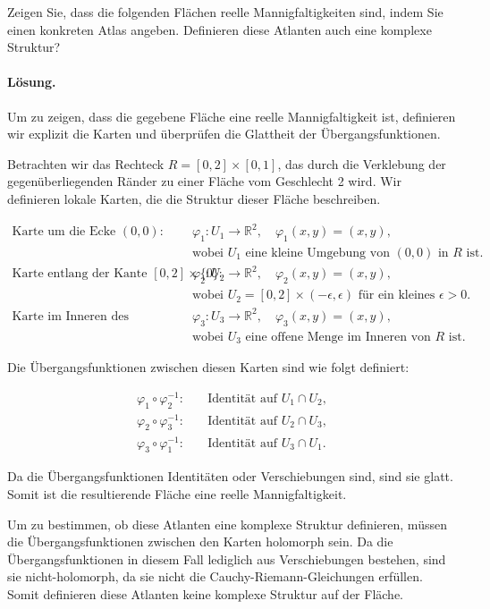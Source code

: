 \documentclass[11pt,a4paper]{article}
\begin{document}
Zeigen Sie, dass die folgenden Flächen reelle Mannigfaltigkeiten sind, indem Sie einen konkreten Atlas angeben. Definieren diese Atlanten auch eine komplexe Struktur?

\paragraph{Lösung.}
Um zu zeigen, dass die gegebene Fläche eine reelle Mannigfaltigkeit ist, definieren wir explizit die Karten und überprüfen die Glattheit der Übergangsfunktionen.

Betrachten wir das Rechteck $R = [0, 2] \times [0, 1]$, das durch die Verklebung der gegenüberliegenden Ränder zu einer Fläche vom Geschlecht 2 wird. Wir definieren lokale Karten, die die Struktur dieser Fläche beschreiben.

\begin{align*}
\text{Karte um die Ecke } (0,0): \quad & \varphi_1: U_1 \to \mathbb{R}^2, \quad \varphi_1(x,y) = (x,y), \\
& \text{wobei } U_1 \text{ eine kleine Umgebung von } (0,0) \text{ in } R \text{ ist.} \\
\text{Karte entlang der Kante } [0,2] \times \{0\}: \quad & \varphi_2: U_2 \to \mathbb{R}^2, \quad \varphi_2(x,y) = (x,y), \\
& \text{wobei } U_2 = [0,2] \times (-\epsilon, \epsilon) \text{ für ein kleines } \epsilon > 0. \\
\text{Karte im Inneren des Rechtecks:} \quad & \varphi_3: U_3 \to \mathbb{R}^2, \quad \varphi_3(x,y) = (x,y), \\
& \text{wobei } U_3 \text{ eine offene Menge im Inneren von } R \text{ ist.}
\end{align*}

Die Übergangsfunktionen zwischen diesen Karten sind wie folgt definiert:

\begin{align*}
\varphi_1 \circ \varphi_2^{-1}: \quad & \text{Identität auf } U_1 \cap U_2, \\
\varphi_2 \circ \varphi_3^{-1}: \quad & \text{Identität auf } U_2 \cap U_3, \\
\varphi_3 \circ \varphi_1^{-1}: \quad & \text{Identität auf } U_3 \cap U_1.
\end{align*}

Da die Übergangsfunktionen Identitäten oder Verschiebungen sind, sind sie glatt. Somit ist die resultierende Fläche eine reelle Mannigfaltigkeit.

Um zu bestimmen, ob diese Atlanten eine komplexe Struktur definieren, müssen die Übergangsfunktionen zwischen den Karten holomorph sein. Da die Übergangsfunktionen in diesem Fall lediglich aus Verschiebungen bestehen, sind sie nicht-holomorph, da sie nicht die Cauchy-Riemann-Gleichungen erfüllen. Somit definieren diese Atlanten keine komplexe Struktur auf der Fläche.

\end{document}
